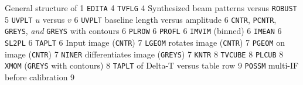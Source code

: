    {General structure of \AIPS}                   {1}
 {{\tt EDITA}}                                  {4}
 {{\tt TVFLG}}                                  {4}
 {Synthesized beam patterns versus {\tt ROBUST}} {5}
 {{\tt UVPLT} $u$ versus $v$}                   {6}
 {{\tt UVPLT} baseline length versus amplitude} {6}
 {{\tt CNTR}, {\tt PCNTR}, {\tt GREYS}, {\it and}
                  {\tt GREYS} with contours}                  {6}
 {{\tt PLROW}}                                {6}
 {{\tt PROFL}}                                {6}
 {{\tt IMVIM} (binned)}                       {6}
 {{\tt IMEAN}}                                {6}
 {{\tt SL2PL}}                                {6}
 {{\tt TAPLT}}                                  {6}
 {Input image ({\tt CNTR})}                     {7}
 {{\tt LGEOM} rotates image ({\tt CNTR})}       {7}
 {{\tt PGEOM} on image ({\tt CNTR})}            {7}
 {{\tt NINER} differentiates image
                                               ({\tt GREYS})}  {7}
 {{\tt KNTR}}                                   {8}
 {{\tt TVCUBE}}                                 {8}
 {{\tt PLCUB}}                                  {8}
   {{\tt XMOM} ({\tt GREYS} with contours)}       {8}
 {{\tt TAPLT} of Delta-T versus table row}      {9}
 {{\tt POSSM} multi-IF before calibration}      {9}
